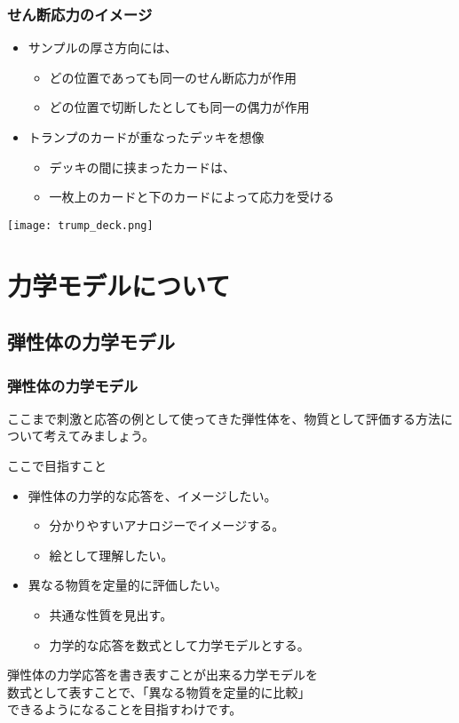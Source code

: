\documentclass[12pt, dvipdfmx]{beamer}
\begin{document}
\begin{frame}
	\frametitle{せん断応力のイメージ}
		\begin{itemize}
			\item サンプルの厚さ方向には、
			\begin{itemize}
				\item どの位置であっても\alert{同一のせん断応力}が作用
				\item どの位置で切断したとしても同一の偶力が作用
			\end{itemize}
			\item トランプのカードが重なったデッキを想像
			\begin{itemize}
				\item デッキの間に挟まったカードは、
				\item 一枚上のカードと下のカードによって応力を受ける
			\end{itemize}
		\end{itemize}
		\begin{center}
			\texttt{[image: trump\_deck.png]}
		\end{center}
\end{frame}

\section{力学モデルについて}
\subsection{弾性体の力学モデル}
\begin{frame}
	\frametitle{弾性体の力学モデル}
	ここまで刺激と応答の例として使ってきた弾性体を、物質として評価する方法について考えてみましょう。
	\begin{exampleblock}{ここで目指すこと}
		\begin{itemize}
			\item 弾性体の力学的な応答を、イメージしたい。
			\begin{itemize}
				\item 分かりやすいアナロジーでイメージする。
				\item 絵として理解したい。
			\end{itemize}
			\item 異なる物質を定量的に評価したい。
			\begin{itemize}
				\item 共通な性質を見出す。
				\item 力学的な応答を数式として力学モデルとする。
			\end{itemize}
		\end{itemize}
	\end{exampleblock}
	弾性体の力学応答を書き表すことが出来る力学モデルを\\数式として表すことで、\alert{「異なる物質を定量的に比較」}\\できるようになることを目指すわけです。
\end{frame}
\end{document}
